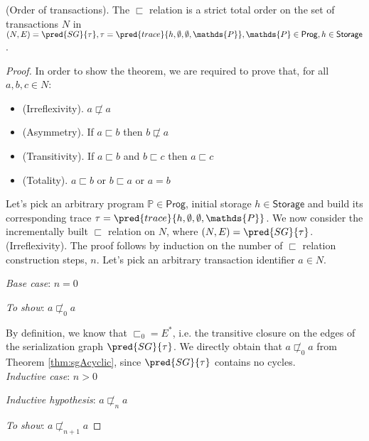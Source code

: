 \begin{thm}
	\label{thm:totOrder}
	(Order of transactions).
	The $\sqsubset$ relation is a strict total order on the set of transactions $N$ in $(N, E) = \pred{SG}{\tau}, \tau = \pred{trace}{h, \emptyset, \emptyset, \mathds{P}}, \mathds{P} \in \mathsf{Prog}, h \in \mathsf{Storage}$.

	\begin{proof}
	In order to show the theorem, we are required to prove that, for all $a, b, c \in N$:
	\begin{itemize}
		\item (Irreflexivity). $a \not\sqsubset a$
		\item (Asymmetry). If $a \sqsubset b$ then $b \not\sqsubset a$
		\item (Transitivity). If $a \sqsubset b$ and $b \sqsubset c$ then $a \sqsubset c$
		\item (Totality). $a \sqsubset b$ or $b \sqsubset a$ or $a = b$
	\end{itemize}
	
	Let's pick an arbitrary program $\mathds{P} \in \mathsf{Prog}$, initial storage $h \in \mathsf{Storage}$ and build its corresponding trace $\tau = \pred{trace}{h, \emptyset, \emptyset, \mathds{P}}$. We now consider the incrementally built $\sqsubset$ relation on $N$, where $(N, E) = \pred{SG}{\tau}$. \\
	
	(Irreflexivity). The proof follows by induction on the number of $\sqsubset$ relation construction steps, $n$. Let's pick an arbitrary transaction identifier $a \in N$.
	
	{\parindent0pt
	\textit{Base case}: $n = 0$
	
	\textit{To show}: $a \not\sqsubset_0 a$
	
	By definition, we know that $\sqsubset_0 = E^*$, i.e. the transitive closure on the edges of the serialization graph $\pred{SG}{\tau}$. We directly obtain that $a \not\sqsubset_0 a$ from Theorem \ref{thm:sgAcyclic}, since $\pred{SG}{\tau}$ contains no cycles. \\
	
	\textit{Inductive case}: $n > 0$
	
	\textit{Inductive hypothesis}: $a \not\sqsubset_n a$
	
	\textit{To show}: $a \not\sqsubset_{n+1} a$
	
}
\end{proof}
\end{thm}
